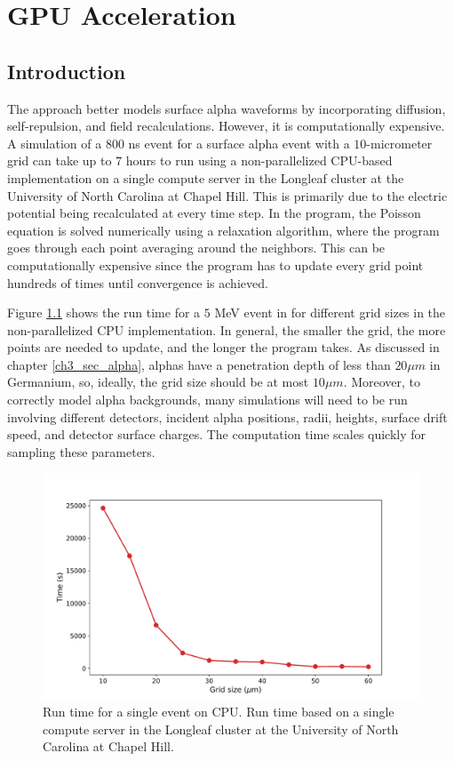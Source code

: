 \chapter{GPU Acceleration}
\label{chap4:gpu}

\section{Introduction}
The {\ehd} approach better models surface alpha waveforms by incorporating diffusion, self-repulsion, and field recalculations. However, it is computationally expensive. A simulation of a $800$ ns event for a surface alpha event with a $10$-micrometer grid can take up to $7$ hours to run using a non-parallelized CPU-based implementation on a single compute server in the Longleaf cluster at the University of North Carolina at Chapel Hill. This is primarily due to the electric potential being recalculated at every time step. In the program, the Poisson equation is solved numerically using a relaxation algorithm, where the program goes through each point averaging around the neighbors. This can be computationally expensive since the program has to update every grid point hundreds of times until convergence is achieved. 

Figure \ref{fig:CPU_time} shows the run time for a $5$ MeV event in {\ehd} for different grid sizes in the non-parallelized CPU implementation. In general, the smaller the grid, the more points are needed to update, and the longer the program takes. As discussed in chapter \ref{ch3_sec_alpha}, alphas have a penetration depth of less than $20 \mu m$ in Germanium, so, ideally, the grid size should be at most $10 \mu m$. Moreover, to correctly model alpha backgrounds, many simulations will need to be run involving different detectors, incident alpha positions, radii, heights, surface drift speed, and detector surface charges. The computation time scales quickly for sampling these parameters.

\begin{figure}
\centering
 \includegraphics[width=0.99\linewidth]{ch4/figs/cpu_run_time.pdf}
\caption{Run time for a single {\ehd} event on CPU. Run time based on a single compute server in the Longleaf cluster at the University of North Carolina at Chapel Hill.}
\label{fig:CPU_time}
\end{figure}

